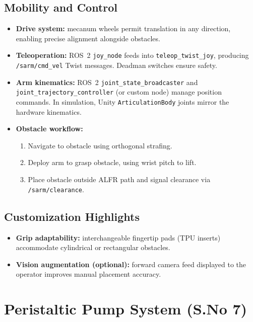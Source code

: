 \documentclass[12pt]{article}
\begin{document}
\subsection{Mobility and Control}
\begin{itemize}
    \item \textbf{Drive system:} mecanum wheels permit translation in any direction, enabling precise alignment alongside obstacles.
    \item \textbf{Teleoperation:} ROS~2 \texttt{joy\_node} feeds into \texttt{teleop\_twist\_joy}, producing \texttt{/sarm/cmd\_vel} Twist messages. Deadman switches ensure safety.
    \item \textbf{Arm kinematics:} ROS~2 \texttt{joint\_state\_broadcaster} and \texttt{joint\_trajectory\_controller} (or custom node) manage position commands. In simulation, Unity \texttt{ArticulationBody} joints mirror the hardware kinematics.
    \item \textbf{Obstacle workflow:}
    \begin{enumerate}
        \item Navigate to obstacle using orthogonal strafing.
        \item Deploy arm to grasp obstacle, using wrist pitch to lift.
        \item Place obstacle outside ALFR path and signal clearance via \texttt{/sarm/clearance}.
    \end{enumerate}
\end{itemize}

\subsection{Customization Highlights}
\begin{itemize}
    \item \textbf{Grip adaptability:} interchangeable fingertip pads (TPU inserts) accommodate cylindrical or rectangular obstacles.
    \item \textbf{Vision augmentation (optional):} forward camera feed displayed to the operator improves manual placement accuracy.
\end{itemize}

\section{Peristaltic Pump System (S.No 7)}\label{sec:pump}
\end{document}
